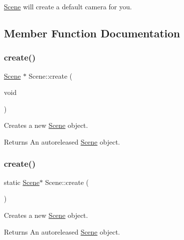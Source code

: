 \hyperlink{classScene}{Scene} will create a default camera for you. 

\subsection{Member Function Documentation}
\mbox{\label{classScene_a49adab0d8120fd9232ab734a2343338c}} 
\subsubsection{\texorpdfstring{create()}{create()}\hspace{0.1cm}{\footnotesize\ttfamily [1/2]}}
{\footnotesize\ttfamily \hyperlink{classScene}{Scene} $\ast$ Scene\+::create (\begin{DoxyParamCaption}\item[{void}]{ }\end{DoxyParamCaption})\hspace{0.3cm}{\ttfamily [static]}}

Creates a new \hyperlink{classScene}{Scene} object.

\begin{DoxyReturn}{Returns}
An autoreleased \hyperlink{classScene}{Scene} object. 
\end{DoxyReturn}
\mbox{\label{classScene_a69bfc1e98a629a8433e1308eca39ff59}} 
\subsubsection{\texorpdfstring{create()}{create()}\hspace{0.1cm}{\footnotesize\ttfamily [2/2]}}
{\footnotesize\ttfamily static \hyperlink{classScene}{Scene}$\ast$ Scene\+::create (\begin{DoxyParamCaption}{ }\end{DoxyParamCaption})\hspace{0.3cm}{\ttfamily [static]}}

Creates a new \hyperlink{classScene}{Scene} object.

\begin{DoxyReturn}{Returns}
An autoreleased \hyperlink{classScene}{Scene} object. 
\end{DoxyReturn}
\mbox{\label{classScene_a7fd7c626da47b96d4357466614285f48}} 
